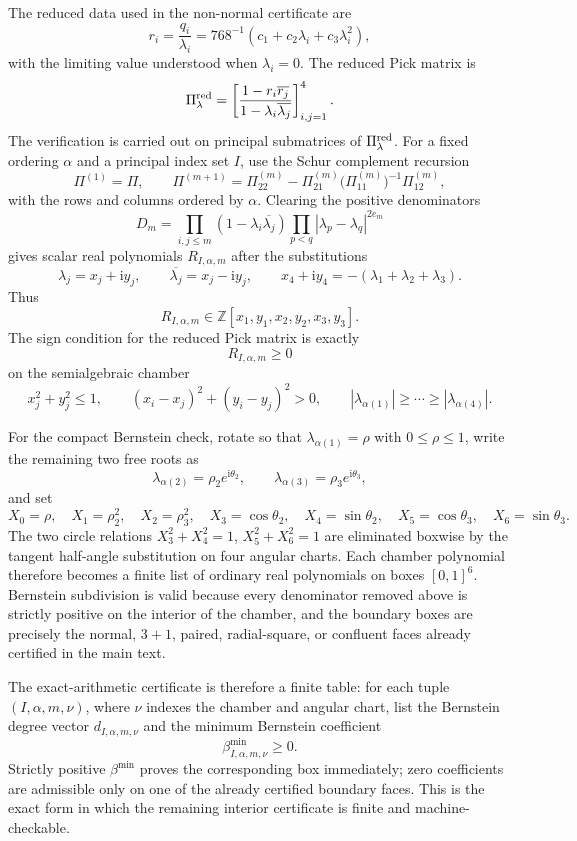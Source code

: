 \documentclass[11pt]{article}
\numberwithin{equation}{section}
\newcommand{\bbZ}{\mathbb Z}
\newcommand{\ii}{\mathrm i}
\begin{document}
The reduced data used in the non-normal certificate are
\[
  r_i=\frac{q_i}{\lambda_i}
  =768^{-1}(c_1+c_2\lambda_i+c_3\lambda_i^2),
\]
with the limiting value understood when \(\lambda_i=0\).  The reduced Pick
matrix is
\[
  \Pi^{\rm red}_\lambda=\left[
  \frac{1-r_i\overline{r_j}}{1-\lambda_i\overline{\lambda_j}}
  \right]_{i,j=1}^4.
\]
The verification is carried out on principal submatrices of
\(\Pi^{\rm red}_\lambda\).  For a fixed ordering \(\alpha\) and a principal
index set \(I\), use the Schur complement recursion
\[
  \Pi^{(1)}=\Pi,\qquad
  \Pi^{(m+1)}=\Pi^{(m)}_{22}
  -\Pi^{(m)}_{21}\bigl(\Pi^{(m)}_{11}\bigr)^{-1}\Pi^{(m)}_{12},
\]
with the rows and columns ordered by \(\alpha\).  Clearing the positive
denominators
\[
  D_m=\prod_{i,j\le m}(1-\lambda_i\overline{\lambda_j})
  \prod_{p<q}|\lambda_p-\lambda_q|^{2e_m}
\]
gives scalar real polynomials \(R_{I,\alpha,m}\) after the substitutions
\[
  \lambda_j=x_j+\ii y_j,\qquad
  \overline{\lambda_j}=x_j-\ii y_j,\qquad
  x_4+\ii y_4=-(\lambda_1+\lambda_2+\lambda_3).
\]
Thus
\[
  R_{I,\alpha,m}\in
  \bbZ[x_1,y_1,x_2,y_2,x_3,y_3].
\]
The sign condition for the reduced Pick matrix is exactly
\[
  R_{I,\alpha,m}\ge0
\]
on the semialgebraic chamber
\[
  x_j^2+y_j^2\le1,\qquad
  (x_i-x_j)^2+(y_i-y_j)^2>0,\qquad
  |\lambda_{\alpha(1)}|\ge\cdots\ge|\lambda_{\alpha(4)}|.
\]

For the compact Bernstein check, rotate so that \(\lambda_{\alpha(1)}=\rho\)
with \(0\le\rho\le1\), write the remaining two free roots as
\[
  \lambda_{\alpha(2)}=\rho_2 e^{\ii\theta_2},\qquad
  \lambda_{\alpha(3)}=\rho_3 e^{\ii\theta_3},
\]
and set
\[
  X_0=\rho,\quad X_1=\rho_2^2,\quad X_2=\rho_3^2,\quad
  X_3=\cos\theta_2,\quad X_4=\sin\theta_2,\quad
  X_5=\cos\theta_3,\quad X_6=\sin\theta_3 .
\]
The two circle relations \(X_3^2+X_4^2=1\),
\(X_5^2+X_6^2=1\) are eliminated boxwise by the tangent half-angle
substitution on four angular charts.  Each chamber polynomial therefore
becomes a finite list of ordinary real polynomials on boxes \([0,1]^6\).
Bernstein subdivision is valid because every denominator removed above is
strictly positive on the interior of the chamber, and the boundary boxes are
precisely the normal, \(3{+}1\), paired, radial-square, or confluent faces
already certified in the main text.

The exact-arithmetic certificate is therefore a finite table:
for each tuple \((I,\alpha,m,\nu)\), where \(\nu\) indexes the chamber and
angular chart, list the Bernstein degree vector \(d_{I,\alpha,m,\nu}\) and the
minimum Bernstein coefficient
\[
  \beta_{I,\alpha,m,\nu}^{\min}\ge0 .
\]
Strictly positive \(\beta^{\min}\) proves the corresponding box immediately;
zero coefficients are admissible only on one of the already certified boundary
faces.  This is the exact form in which the remaining interior certificate is
finite and machine-checkable.
\end{document}
